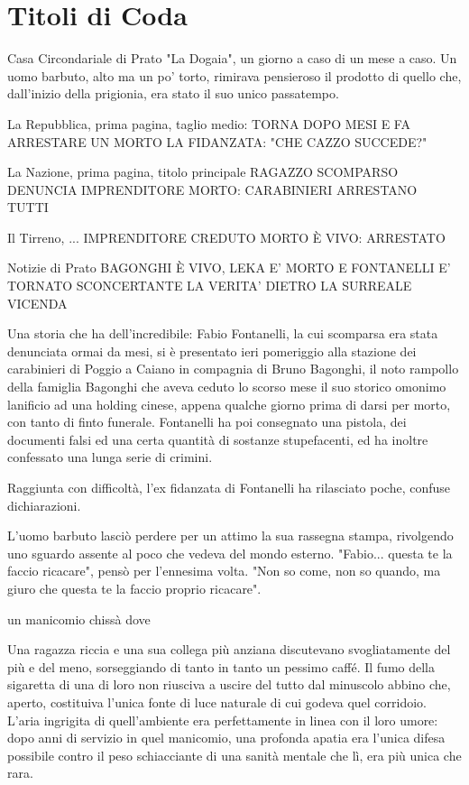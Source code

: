 \chapter{Titoli di Coda}


Casa Circondariale di Prato "La Dogaia", un giorno a caso di un mese a caso. Un uomo barbuto, alto ma un po' torto, rimirava pensieroso il prodotto di quello che, dall'inizio della prigionia, era stato il suo unico passatempo.

La Repubblica, prima pagina, taglio medio:
TORNA DOPO MESI E FA ARRESTARE UN MORTO
LA FIDANZATA: "CHE CAZZO SUCCEDE?"

La Nazione, prima pagina, titolo principale
RAGAZZO SCOMPARSO DENUNCIA IMPRENDITORE MORTO: CARABINIERI ARRESTANO TUTTI

Il Tirreno, ...
IMPRENDITORE CREDUTO MORTO È VIVO: ARRESTATO

Notizie di Prato
BAGONGHI È VIVO, LEKA E' MORTO E FONTANELLI E' TORNATO
SCONCERTANTE LA VERITA' DIETRO LA SURREALE VICENDA

Una storia che ha dell'incredibile: Fabio Fontanelli, la cui scomparsa era stata denunciata ormai da mesi, si è presentato ieri pomeriggio alla stazione dei carabinieri di Poggio a Caiano in compagnia di Bruno Bagonghi, il noto rampollo della famiglia Bagonghi che aveva ceduto lo scorso mese il suo storico omonimo lanificio ad una holding cinese, appena qualche giorno prima di darsi per morto, con tanto di finto funerale. Fontanelli ha poi consegnato una pistola, dei documenti falsi ed una certa quantità di sostanze stupefacenti, ed ha inoltre confessato una lunga serie di crimini.

Raggiunta con difficoltà, l'ex fidanzata di Fontanelli ha rilasciato poche, confuse dichiarazioni.

L'uomo barbuto lasciò perdere per un attimo la sua rassegna stampa, rivolgendo uno sguardo assente al poco che vedeva del mondo esterno. "Fabio... questa te la faccio ricacare", pensò per l'ennesima volta. "Non so come, non so quando, ma giuro che questa te la faccio proprio ricacare".


un manicomio chissà dove

Una ragazza riccia e una sua collega più anziana discutevano svogliatamente del più e del meno, sorseggiando di tanto in tanto un pessimo caffé. Il fumo della sigaretta di una di loro non riusciva a uscire del tutto dal minuscolo abbino che, aperto, costituiva l'unica fonte di luce naturale di cui godeva quel corridoio. L'aria ingrigita di quell'ambiente era perfettamente in linea con il loro umore: dopo anni di servizio in quel manicomio, una profonda apatia era l'unica difesa possibile contro il peso schiacciante di una sanità mentale che lì, era più unica che rara.

